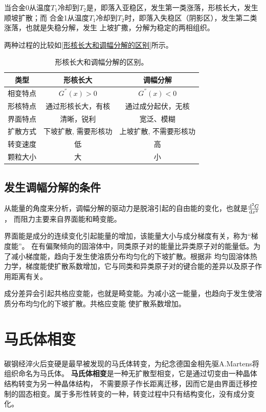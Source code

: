             当合金0从温度$T_1$冷却到$T_2$是，即落入亚稳区，发生第一类涨落，形核长大，发生顺坡扩散；而
            合金1从温度$T_1$冷却到$T_2$时，即落入失稳区（阴影区），发生第二类涨落，也就是失稳分解，发生
            上坡扩撒，分解为稳定的两相组织。

            两种过程的比较如\autoref{形核长大和调幅分解的区别}所示。
            \begin{table}[ht]
                \centering
                \caption{形核长大和调幅分解的区别。}
                \label{形核长大和调幅分解的区别}
                \begin{tabular}{ccc}
                    \toprule
                    类型&形核长大&调幅分解\\
                    \midrule
                    相变特点&$G^{''}(x)>0$&$G^{''}(x)<0$\\
                    形核特点&通过形核长大，有核&通过成分起伏，无核\\
                    界面特点&清晰，锐利&宽泛、模糊\\
                    扩散方式&下坡扩散, 需要形核功&上坡扩散, 不需要形核功\\
                    转变速度&低&高\\
                    颗粒大小&大&小\\
                    \bottomrule
                \end{tabular}
            \end{table}
        \subsection{发生调幅分解的条件}
            从能量的角度来分析，调幅分解的驱动力是脱溶引起的自由能的变化，也就是$\frac{\mathop{}\!\mathrm{d}^2 G }{\mathop{}\!\mathrm{d} x^2}$，
            而阻力主要来自界面能和畸变能。

            界面能是成分的连续变化引起能量的增加，该能量大小与成分梯度有关，称为“梯度能”。
            在有偏聚倾向的固溶体中，同类原子对的能量比异类原子对的能量低。为了减小梯度能，趋向于发生使溶质分布均匀化的下坡扩散。根据非
            均匀固溶体热力学，梯度能使扩散系数增加，它与同类和异类原子对的键合能的差异以及原子作用距离有关。

            成分差异会引起共格应变能，也就是畸变能。为减小这一能量，也趋向于发生使溶质分布均匀化的下坡扩散。共格应变能
            使扩散系数增加。
    \section{马氏体相变}
        碳钢经淬火后变硬是最早被发现的马氏体转变，为纪念德国金相先驱A.Martens将组织命名为马氏体。
        \textbf{马氏体相变}是一种无扩散型相变，它是通过切变由一种晶体结构转变为另一种晶体结构，
        不需要原子作长距离迁移，因而它是由界面迁移控制的固态相变。属于多形性转变的一种，转变过程中只有结构变化，没有成分变化。

